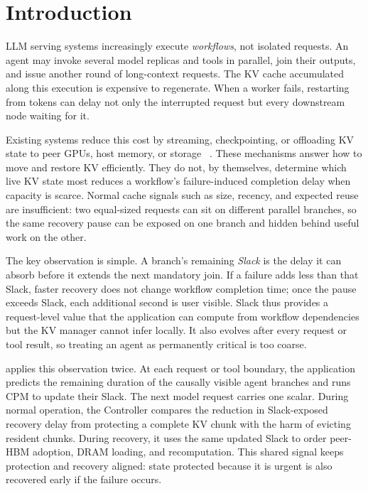 \section{Introduction}
\label{sec:introduction}

LLM serving systems increasingly execute \emph{workflows}, not isolated
requests.  An agent may invoke several model replicas and tools in parallel,
join their outputs, and issue another round of long-context requests.  The KV
cache accumulated along this execution is expensive to regenerate.  When a
worker fails, restarting from tokens can delay not only the interrupted request
but every downstream node waiting for it.

Existing systems reduce this cost by streaming, checkpointing, or offloading KV
state to peer GPUs, host memory, or storage
~\cite{strati2024dejavu,jayakody2026ghostserve,qin2025mooncake,xie2025hicache}.
These mechanisms answer how to move and restore KV efficiently.  They do not,
by themselves, determine which live KV state most reduces a workflow's
failure-induced completion delay when capacity is scarce.  Normal cache signals
such as size, recency, and expected reuse are insufficient: two equal-sized
requests can sit on different parallel branches, so the same recovery pause can
be exposed on one branch and hidden behind useful work on the other.

The key observation is simple.  A branch's remaining \emph{Slack} is the delay
it can absorb before it extends the next mandatory join.  If a failure adds less
than that Slack, faster recovery does not change workflow completion time; once
the pause exceeds Slack, each additional second is user visible.  Slack thus
provides a request-level value that the application can compute from workflow
dependencies but the KV manager cannot infer locally.  It also evolves after
every request or tool result, so treating an agent as permanently critical is
too coarse.

\system{} applies this observation twice.  At each request or tool boundary,
the application predicts the remaining duration of the causally visible agent
branches and runs CPM to update their Slack.  The next model request carries
one scalar.  During normal operation, the Controller compares the reduction in
Slack-exposed recovery delay from protecting a complete KV chunk with the harm
of evicting resident chunks.  During recovery, it uses the same updated Slack
to order peer-HBM adoption, DRAM loading, and recomputation.  This shared signal
keeps protection and recovery aligned: state protected because it is urgent is
also recovered early if the failure occurs.

